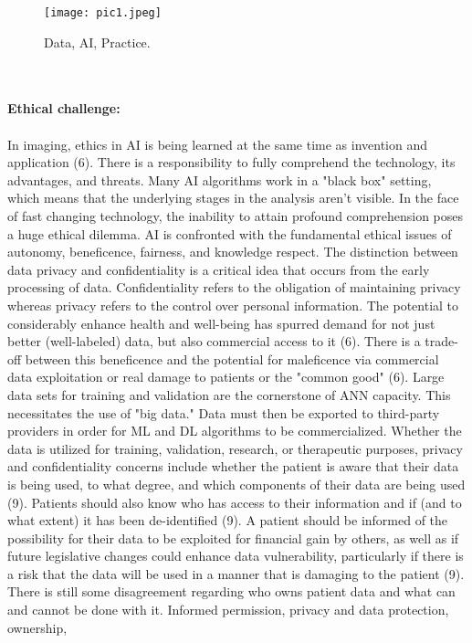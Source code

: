 \documentclass[12pt]{article}
\begin{document}
\begin{figure}
    \centering
    \texttt{[image: pic1.jpeg]}
    \caption{Data, AI, Practice.}
\end{figure}
\\ \\

\noindent \textbf{\large Ethical challenge:} \\ \\ In imaging, ethics in AI is being learned at the same time as invention and application (6). There is a
responsibility to fully comprehend the technology, its advantages, and threats. Many AI algorithms work in a
"black box" setting, which means that the underlying stages in the analysis aren't visible. In the face of fast
changing technology, the inability to attain profound comprehension poses a huge ethical dilemma. AI is
confronted with the fundamental ethical issues of autonomy, beneficence, fairness, and knowledge respect. The
distinction between data privacy and confidentiality is a critical idea that occurs from the early processing of
data. Confidentiality refers to the obligation of maintaining privacy whereas privacy refers to the control over
personal information. The potential to considerably enhance health and well-being has spurred demand for not
just better (well-labeled) data, but also commercial access to it (6). There is a trade-off between this
beneficence and the potential for maleficence via commercial data exploitation or real damage to patients or
the "common good" (6). Large data sets for training and validation are the cornerstone of ANN capacity. This
necessitates the use of "big data." Data must then be exported to third-party providers in order for ML and DL
algorithms to be commercialized. Whether the data is utilized for training, validation, research, or therapeutic
purposes, privacy and confidentiality concerns include whether the patient is aware that their data is being used, to what degree, and which components of their data are being used (9). Patients should also know who has
access to their information and if (and to what extent) it has been de-identified (9). A patient should be
informed of the possibility for their data to be exploited for financial gain by others, as well as if future
legislative changes could enhance data vulnerability, particularly if there is a risk that the data will be used in a
manner that is damaging to the patient (9). There is still some disagreement regarding who owns patient data
and what can and cannot be done with it. Informed permission, privacy and data protection, ownership,
\end{document}
